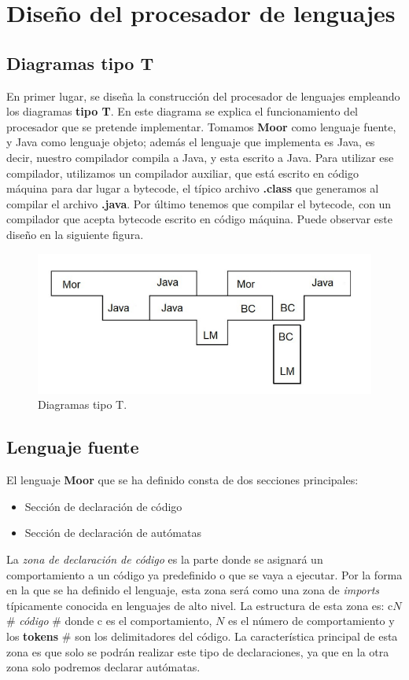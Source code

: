\documentclass[12pt,a4paper]{article}
\begin{document}
\section{Diseño del procesador de lenguajes}

\subsection{Diagramas tipo T}
En primer lugar, se diseña la construcción del procesador de lenguajes empleando los diagramas \textbf{tipo T}. En este diagrama se explica el funcionamiento del procesador que se pretende implementar. Tomamos \textbf{ Moor } como lenguaje fuente, y Java como lenguaje objeto; además el lenguaje que implementa es Java, es decir, nuestro compilador compila a Java, y esta escrito a Java. 
\newline
Para utilizar ese compilador, utilizamos un compilador auxiliar, que está escrito en código máquina para dar lugar a bytecode, el típico archivo \textbf{.class} que generamos al compilar el archivo \textbf{.java}.
\newline
Por último tenemos que compilar el bytecode, con un compilador que acepta bytecode escrito en código máquina. Puede observar este diseño en la siguiente figura.

	\begin{figure}[h]
		\centering
		\includegraphics[width=0.5
		\linewidth]{img/T.png}
		\caption{Diagramas tipo T.}
		\label{fig:modelo-moore}
	\end{figure}

\subsection{Lenguaje fuente}
El lenguaje \textbf{Moor} que se ha definido consta de dos secciones principales:

\begin{itemize}
	\item Sección de declaración de código
	\item Sección de declaración de autómatas
\end{itemize}

La \textit{zona de declaración de código} es la parte donde se asignará un comportamiento a un código ya predefinido o que se vaya a ejecutar. Por la forma en la que se ha definido el lenguaje, esta zona será como una zona de \textit{imports} típicamente conocida en lenguajes de alto nivel. 
\newline
\newline
La estructura de esta zona es: c$N$ $\#$ \textit{código} $\#$ donde c es el comportamiento, $N$ es el número de comportamiento y los \textbf{tokens} $\#$ son los delimitadores del código. \newline La característica principal de esta zona es que solo se podrán realizar este tipo de declaraciones, ya que en la otra zona solo podremos declarar autómatas.
\end{document}
